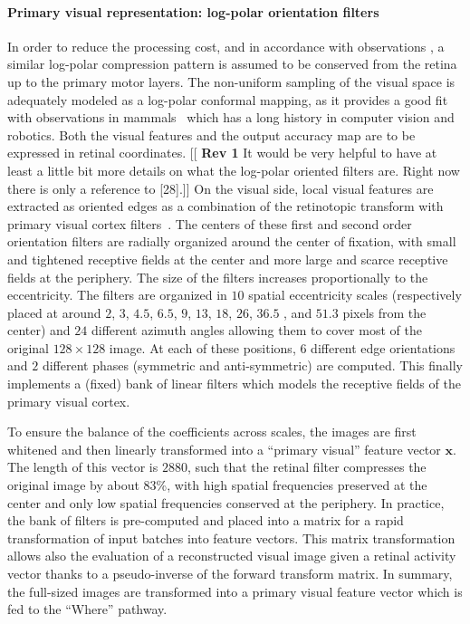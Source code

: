 \paragraph{Primary visual representation: log-polar orientation filters}
In order to reduce the processing cost, and in accordance with observations \cite{connolly1984representation,sparks1987sensory}, a similar log-polar compression pattern is assumed to be conserved from the retina up to the primary motor layers.
The non-uniform sampling of the visual space is adequately modeled as a log-polar conformal mapping, as it provides a good fit with observations in mammals~\cite{Traver10} which has a long history in computer vision and robotics.
Both the visual features and the output accuracy map are to be expressed in retinal coordinates.
{\color{magenta} [[ \textbf{Rev 1} It would be very helpful to have at least a little bit more details on what the log-polar oriented filters are. Right now there is only a reference to [28].]]}
On the visual side, local visual features are extracted as oriented edges as a combination of the retinotopic transform with primary visual cortex filters~\cite{Fischer2007a}. The centers of these first and second order orientation filters are radially organized around the center of fixation, with small and tightened receptive fields at the center and more large and scarce receptive fields at the periphery.
The size of the filters increases proportionally to the eccentricity.  The filters are organized in $10$ spatial eccentricity scales (respectively placed at around $2$, $3$, $4.5$, $6.5$, $9$, $13$, $18$, $26$, $36.5$ , and $51.3$ pixels from the center) and $24$ different azimuth angles allowing them to cover most of the original $128 \times 128 $ image. At each of these positions,  $6$ different edge orientations and $2$ different phases (symmetric and anti-symmetric) are computed. This finally implements a (fixed) bank of linear filters which models the receptive fields of the primary visual cortex.

To ensure the balance of the coefficients across scales, the images are first whitened and then linearly transformed into a ``primary visual'' feature vector $\boldsymbol{x}$.  The length of this vector is $2880$, such that the retinal filter compresses the original image by about 83\%, with high spatial frequencies preserved at the center and only low spatial frequencies conserved at the periphery. In practice, the bank of filters is pre-computed and placed into a matrix for a rapid transformation of input batches into  feature vectors. This matrix transformation allows also the evaluation of a reconstructed visual image given a retinal activity vector thanks to a pseudo-inverse of the forward transform matrix. In summary, the full-sized images are transformed into a primary visual feature vector which is fed to the ``Where'' pathway.

